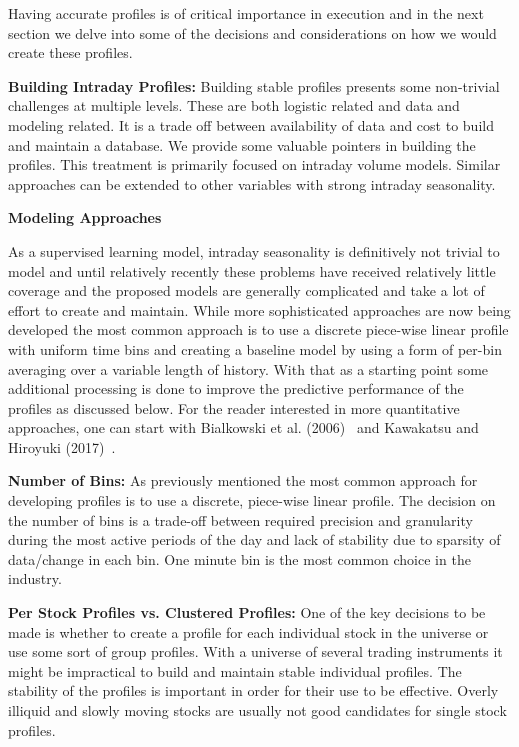 Having accurate profiles is of critical importance in execution and in the next section we delve into some of the decisions and considerations on how we would create these profiles. \twomedskip



\noindent\textbf{Building Intraday Profiles:} Building stable profiles presents some non-trivial challenges at multiple levels. These are both logistic related and data and modeling related. It is a trade off between availability of data and cost to build and maintain a database. We provide some valuable pointers in building the profiles. This treatment is primarily focused on intraday volume models. Similar approaches can be extended to other variables with strong intraday seasonality. \twomedskip


\noindent\textbf{Modeling Approaches} \twomedskip

As a supervised learning model, intraday seasonality is definitively not trivial to model and until relatively recently these problems have received relatively little coverage and the proposed models are generally complicated and take a lot of effort to create and maintain. While more sophisticated approaches are now being developed the most common approach is to use a discrete piece-wise linear profile with uniform time bins and creating a baseline model by using a form of per-bin averaging over a variable length of history. With that as a starting point some additional processing is done to improve the predictive performance of the profiles as discussed below. For the reader interested in more quantitative approaches, one can start with Bialkowski et al. (2006)~\cite{bidafol} and Kawakatsu and Hiroyuki (2017)~\cite{kawhiro}. \twomedskip


\noindent\textbf{Number of Bins:} As previously mentioned the most common approach for developing profiles is to use a discrete, piece-wise linear profile. The decision on the number of bins is a trade-off between required precision and granularity during the most active periods of the day and lack of stability due to sparsity of data/change in each bin. One minute bin is the most common choice in the industry. \twomedskip


\noindent\textbf{Per Stock Profiles vs. Clustered Profiles:} One of the key decisions to be made is whether to create a profile for each individual stock in the universe or use some sort of group profiles. With a universe of several trading instruments it might be impractical to build and maintain stable individual profiles. The stability of the profiles is important in order for their use to be effective. Overly illiquid and slowly moving stocks are usually not good candidates for single stock profiles. 


